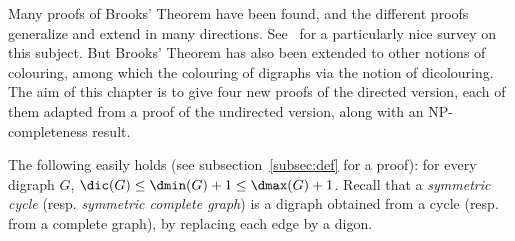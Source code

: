 Many proofs of Brooks' Theorem have been found, and the different proofs generalize and extend in many directions. See~\cite{CR14} for a particularly nice survey on this subject. 
But Brooks' Theorem has also been extended to other notions of colouring, among which the colouring of digraphs via the notion of dicolouring. 
The aim of this chapter is to give four new proofs of the directed version, each of them adapted from a proof of the undirected version, along with an NP-completeness result. 
\medskip





The following easily holds (see subsection~\ref{subsec:def} for a proof): for every digraph $G$, $\dic(G) \leq \dmin(G) +1 \leq \dmax(G) +1$. %
Recall that a \emph{symmetric cycle} (resp. \emph{symmetric complete graph}) is a digraph obtained from a cycle (resp. from a complete graph), by replacing each edge by a digon.



